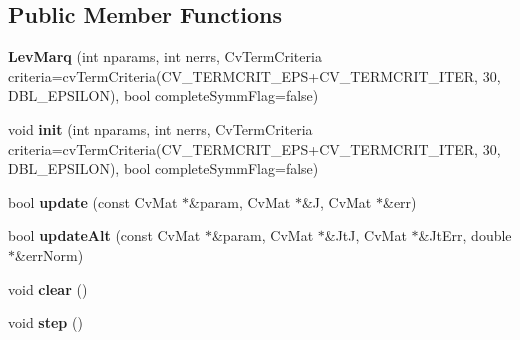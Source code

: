 \subsection*{Public Member Functions}
\begin{DoxyCompactItemize}
\item 
\hypertarget{classLevMarq_a99bcd18817a2cc94b6a35a1719951f8a}{{\bfseries Lev\-Marq} (int nparams, int nerrs, Cv\-Term\-Criteria criteria=cv\-Term\-Criteria(C\-V\-\_\-\-T\-E\-R\-M\-C\-R\-I\-T\-\_\-\-E\-P\-S+C\-V\-\_\-\-T\-E\-R\-M\-C\-R\-I\-T\-\_\-\-I\-T\-E\-R, 30, D\-B\-L\-\_\-\-E\-P\-S\-I\-L\-O\-N), bool complete\-Symm\-Flag=false)}\label{classLevMarq_a99bcd18817a2cc94b6a35a1719951f8a}

\item 
\hypertarget{classLevMarq_a367aac3258cff53fb39d59d499f7b21b}{void {\bfseries init} (int nparams, int nerrs, Cv\-Term\-Criteria criteria=cv\-Term\-Criteria(C\-V\-\_\-\-T\-E\-R\-M\-C\-R\-I\-T\-\_\-\-E\-P\-S+C\-V\-\_\-\-T\-E\-R\-M\-C\-R\-I\-T\-\_\-\-I\-T\-E\-R, 30, D\-B\-L\-\_\-\-E\-P\-S\-I\-L\-O\-N), bool complete\-Symm\-Flag=false)}\label{classLevMarq_a367aac3258cff53fb39d59d499f7b21b}

\item 
\hypertarget{classLevMarq_a2d71b01830f3c56b707f794518780e90}{bool {\bfseries update} (const Cv\-Mat $\ast$\&param, Cv\-Mat $\ast$\&J, Cv\-Mat $\ast$\&err)}\label{classLevMarq_a2d71b01830f3c56b707f794518780e90}

\item 
\hypertarget{classLevMarq_ac68ac93b105cf0bacc9d694149592a3c}{bool {\bfseries update\-Alt} (const Cv\-Mat $\ast$\&param, Cv\-Mat $\ast$\&Jt\-J, Cv\-Mat $\ast$\&Jt\-Err, double $\ast$\&err\-Norm)}\label{classLevMarq_ac68ac93b105cf0bacc9d694149592a3c}

\item 
\hypertarget{classLevMarq_acf5194a53c5be41b88465a0984bea9b8}{void {\bfseries clear} ()}\label{classLevMarq_acf5194a53c5be41b88465a0984bea9b8}

\item 
\hypertarget{classLevMarq_aace014ab6b2063babe12aabf0311c24c}{void {\bfseries step} ()}\label{classLevMarq_aace014ab6b2063babe12aabf0311c24c}

\end{DoxyCompactItemize}
